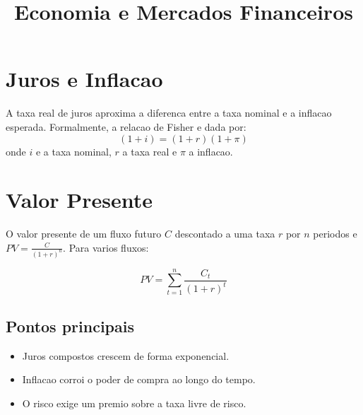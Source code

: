 \documentclass{article}
\title{Economia e Mercados Financeiros}
\begin{document}
\maketitle

\section{Juros e Inflacao}
A taxa real de juros aproxima a diferenca entre a taxa nominal e a
inflacao esperada. Formalmente, a relacao de Fisher e dada por:
\[ (1 + i) = (1 + r)(1 + \pi) \]
onde $i$ e a taxa nominal, $r$ a taxa real e $\pi$ a inflacao.

\section{Valor Presente}
O valor presente de um fluxo futuro $C$ descontado a uma taxa $r$ por
$n$ periodos e $PV = \frac{C}{(1 + r)^n}$. Para varios fluxos:

\[ PV = \sum_{t=1}^{n} \frac{C_t}{(1 + r)^t} \]

\subsection{Pontos principais}
\begin{itemize}
\item Juros compostos crescem de forma exponencial.
\item Inflacao corroi o poder de compra ao longo do tempo.
\item O risco exige um premio sobre a taxa livre de risco.
\end{itemize}
\end{document}
